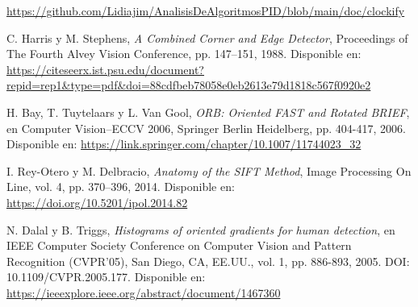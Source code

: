 \documentclass[a4paper]{article}
\begin{document}
\begin{center}
    \url{https://github.com/Lidiajim/AnalisisDeAlgoritmosPID/blob/main/doc/clockify}
\end{center}

\newpage

\begin{thebibliography}{10}

  C. Harris y M. Stephens, \emph{A Combined Corner and Edge Detector}, Proceedings of The Fourth Alvey Vision Conference, pp. 147–151, 1988. Disponible en: \url{https://citeseerx.ist.psu.edu/document?repid=rep1&type=pdf&doi=88cdfbeb78058e0eb2613e79d1818c567f0920e2}
  
  H. Bay, T. Tuytelaars y L. Van Gool, \emph{ORB: Oriented FAST and Rotated BRIEF}, en Computer Vision–ECCV 2006, Springer Berlin Heidelberg, pp. 404-417, 2006. Disponible en: \url{https://link.springer.com/chapter/10.1007/11744023_32}
  
  I. Rey-Otero y M. Delbracio, \emph{Anatomy of the SIFT Method}, Image Processing On Line, vol. 4, pp. 370–396, 2014. Disponible en: \url{https://doi.org/10.5201/ipol.2014.82}
  
  N. Dalal y B. Triggs, \emph{Histograms of oriented gradients for human detection}, en IEEE Computer Society Conference on Computer Vision and Pattern Recognition (CVPR'05), San Diego, CA, EE.UU., vol. 1, pp. 886-893, 2005. DOI: 10.1109/CVPR.2005.177. Disponible en: \url{https://ieeexplore.ieee.org/abstract/document/1467360}
  
  \end{thebibliography}
\end{document}
